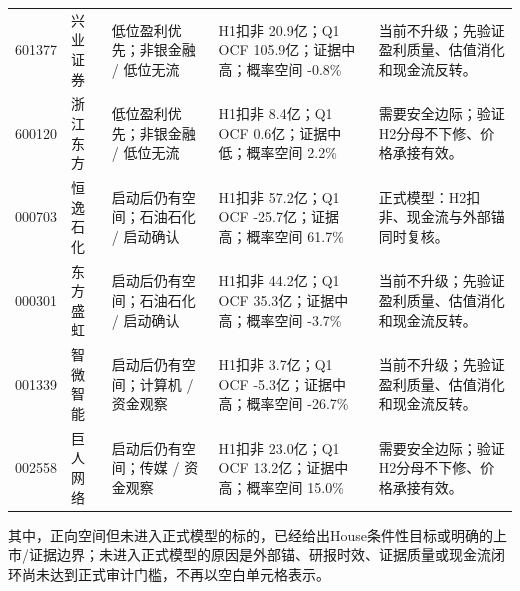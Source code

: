 \begin{longtable}{L{1.15cm}L{1.55cm}L{2.35cm}L{2.55cm}L{2.55cm}}
601377 & 兴业证券 & 低位盈利优先；非银金融 / 低位无流 & H1扣非 20.9亿；Q1 OCF 105.9亿；证据中高；概率空间 -0.8\% & 当前不升级；先验证盈利质量、估值消化和现金流反转。 \\
600120 & 浙江东方 & 低位盈利优先；非银金融 / 低位无流 & H1扣非 8.4亿；Q1 OCF 0.6亿；证据中低；概率空间 2.2\% & 需要安全边际；验证H2分母不下修、价格承接有效。 \\
000703 & 恒逸石化 & 启动后仍有空间；石油石化 / 启动确认 & H1扣非 57.2亿；Q1 OCF -25.7亿；证据高；概率空间 61.7\% & 正式模型：H2扣非、现金流与外部锚同时复核。 \\
000301 & 东方盛虹 & 启动后仍有空间；石油石化 / 启动确认 & H1扣非 44.2亿；Q1 OCF 35.3亿；证据中高；概率空间 -3.7\% & 当前不升级；先验证盈利质量、估值消化和现金流反转。 \\
001339 & 智微智能 & 启动后仍有空间；计算机 / 资金观察 & H1扣非 3.7亿；Q1 OCF -5.3亿；证据中高；概率空间 -26.7\% & 当前不升级；先验证盈利质量、估值消化和现金流反转。 \\
002558 & 巨人网络 & 启动后仍有空间；传媒 / 资金观察 & H1扣非 23.0亿；Q1 OCF 13.2亿；证据中高；概率空间 15.0\% & 需要安全边际；验证H2分母不下修、价格承接有效。 \\
\bottomrule
\end{longtable}
\normalsize

其中，正向空间但未进入正式模型的标的，已经给出House条件性目标或明确的上市/证据边界；未进入正式模型的原因是外部锚、研报时效、证据质量或现金流闭环尚未达到正式审计门槛，不再以空白单元格表示。
